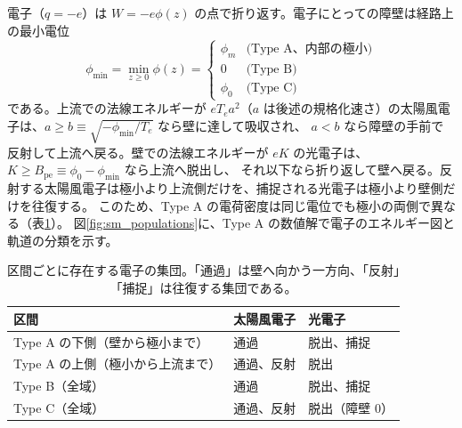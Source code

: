 電子（$q=-e$）は $W=-e\phi(z)$ の点で折り返す。電子にとっての障壁は経路上の最小電位
\begin{equation}
 \phi_{\min}=\min_{z\ge0}\phi(z)=
 \begin{cases}\phi_m&\text{(Type A、内部の極小)}\\0&\text{(Type B)}\\\phi_0&\text{(Type C)}\end{cases}
\end{equation}
である。上流での法線エネルギーが $eT_ea^2$（$a$ は後述の規格化速さ）の太陽風電子は、$a\ge b\equiv\sqrt{-\phi_{\min}/T_e}$ なら壁に達して吸収され、
$a<b$ なら障壁の手前で反射して上流へ戻る。壁での法線エネルギーが $eK$ の光電子は、$K\ge B_{\mathrm{pe}}\equiv\phi_0-\phi_{\min}$ なら上流へ脱出し、
それ以下なら折り返して壁へ戻る。反射する太陽風電子は極小より上流側だけを、捕捉される光電子は極小より壁側だけを往復する。
このため、Type A の電荷密度は同じ電位でも極小の両側で異なる（表\ref{tab:sm_populations}）。
図\ref{fig:sm_populations}に、Type A の数値解で電子のエネルギー図と軌道の分類を示す。

\begin{table}[htbp]
\centering
\caption{区間ごとに存在する電子の集団。「通過」は壁へ向かう一方向、「反射」「捕捉」は往復する集団である。}
\label{tab:sm_populations}
\begin{tabular}{lll}
\toprule
区間 & 太陽風電子 & 光電子 \\
\midrule
Type A の下側（壁から極小まで） & 通過 & 脱出、捕捉 \\
Type A の上側（極小から上流まで） & 通過、反射 & 脱出 \\
Type B（全域） & 通過 & 脱出、捕捉 \\
Type C（全域） & 通過、反射 & 脱出（障壁 0） \\
\bottomrule
\end{tabular}
\end{table}



